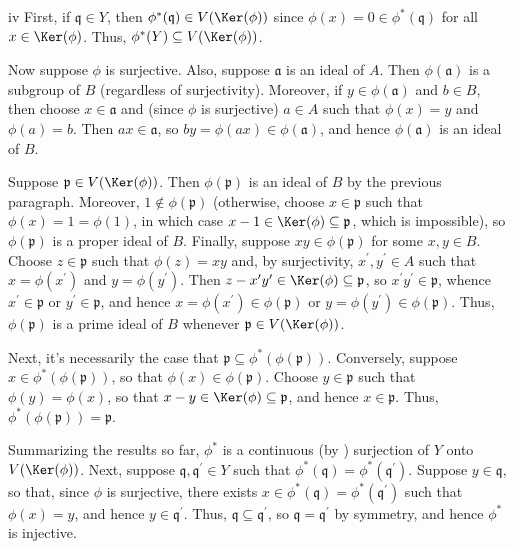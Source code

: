\begin{partsolution}{iv}
First, if \(\mathfrak{q} \in Y\), then \(\phi^*(\mathfrak{q}) \in V(\Ker(\phi))\) since \(\phi(x) = 0 \in \phi^*(\mathfrak{q})\) for all \(x \in \Ker(\phi)\).
Thus, \(\phi^*(Y) \subseteq V(\Ker(\phi))\).

Now suppose \(\phi\) is surjective.
Also, suppose \(\mathfrak{a}\) is an ideal of \(A\).
Then \(\phi(\mathfrak{a})\) is a subgroup of \(B\) (regardless of surjectivity).
Moreover, if \(y \in \phi(\mathfrak{a})\) and \(b \in B\), then choose \(x \in \mathfrak{a}\) and (since \(\phi\) is surjective) \(a \in A\) such that \(\phi(x) = y\) and \(\phi(a) = b\).
Then \(a x \in \mathfrak{a}\), so \(b y = \phi(a x) \in \phi(\mathfrak{a})\), and hence \(\phi(\mathfrak{a})\) is an ideal of \(B\).

Suppose \(\mathfrak{p} \in V(\Ker(\phi))\).
Then \(\phi(\mathfrak{p})\) is an ideal of \(B\) by the previous paragraph.
Moreover, \(1 \notin \phi(\mathfrak{p})\) (otherwise, choose \(x \in \mathfrak{p}\) such that \(\phi(x) = 1 = \phi(1)\), in which case \(x - 1 \in \Ker(\phi) \subseteq \mathfrak{p}\), which is impossible), so \(\phi(\mathfrak{p})\) is a proper ideal of \(B\).
Finally, suppose \(x y \in \phi(\mathfrak{p})\) for some \(x, y \in B\).
Choose \(z \in \mathfrak{p}\) such that \(\phi(z) = x y\) and, by surjectivity, \(x^\prime, y^\prime \in A\) such that \(x = \phi(x^\prime)\) and \(y = \phi(y^\prime)\).
Then \(z - x^\prime y^\prime \in \Ker(\phi) \subseteq \mathfrak{p}\), so \(x^\prime y^\prime \in \mathfrak{p}\), whence \(x^\prime \in \mathfrak{p}\) or \(y^\prime \in \mathfrak{p}\), and hence \(x = \phi(x^\prime) \in \phi(\mathfrak{p})\) or \(y = \phi(y^\prime) \in \phi(\mathfrak{p})\).
Thus, \(\phi(\mathfrak{p})\) is a prime ideal of \(B\) whenever \(\mathfrak{p} \in V(\Ker(\phi))\).

Next, it's necessarily the case that \(\mathfrak{p} \subseteq \phi^*(\phi(\mathfrak{p}))\).
Conversely, suppose \(x \in \phi^*(\phi(\mathfrak{p}))\), so that \(\phi(x) \in \phi(\mathfrak{p})\).
Choose \(y \in \mathfrak{p}\) such that \(\phi(y) = \phi(x)\), so that \(x - y \in \Ker(\phi) \subseteq \mathfrak{p}\), and hence \(x \in \mathfrak{p}\).
Thus, \(\phi^*(\phi(\mathfrak{p})) = \mathfrak{p}\).

Summarizing the results so far, \(\phi^*\) is a continuous (by ) surjection of \(Y\) onto \(V(\Ker(\phi))\).
Next, suppose \(\mathfrak{q}, \mathfrak{q}^\prime \in Y\) such that \(\phi^*(\mathfrak{q}) = \phi^*(\mathfrak{q}^\prime)\).
Suppose \(y \in \mathfrak{q}\), so that, since \(\phi\) is surjective, there exists \(x \in \phi^*(\mathfrak{q}) = \phi^*(\mathfrak{q}^\prime)\) such that \(\phi(x) = y\), and hence \(y \in \mathfrak{q}^\prime\).
Thus, \(\mathfrak{q} \subseteq \mathfrak{q}^\prime\), so \(\mathfrak{q} = \mathfrak{q}^\prime\) by symmetry, and hence \(\phi^*\) is injective.


\end{partsolution}
